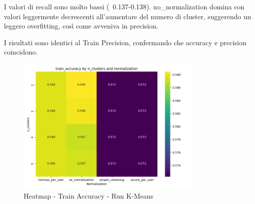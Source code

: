 I valori di recall sono molto bassi (~0.137-0.138). no\_normalization domina con valori leggermente decrescenti all'aumentare del numero di cluster, suggerendo un leggero overfitting, così come avveniva in precision.

\begin{table}[H]
  \centering
  \caption{Top 5 Configurazioni per Train Accuracy - Run K-Means}
\end{table}

I risultati sono identici al Train Precision, confermando che accuracy e precision coincidono.

\begin{figure}[H]
  \centering
  \includegraphics[width=0.8\textwidth]{../output/run_kmeans/images/train/accuracy/heatmap_train_accuracy.png}
  \caption{Heatmap - Train Accuracy - Run K-Means}
  \label{fig:train_accuracy_kmeans}
\end{figure}

